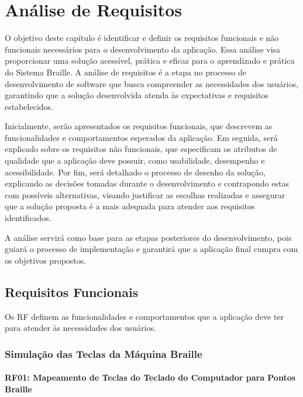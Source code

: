\chapter{Análise de Requisitos} 
\label{chap:Chapter05}

O objetivo deste capítulo é identificar e definir os requisitos funcionais e não funcionais necessários para o desenvolvimento da aplicação. Essa análise visa proporcionar uma solução acessível, prática e eficaz para o aprendizado e prática do Sistema Braille. A análise de requisitos é a etapa no processo de desenvolvimento de software que busca compreender as necessidades dos usuários, garantindo que a solução desenvolvida atenda às expectativas e requisitos estabelecidos.

Inicialmente, serão apresentados os requisitos funcionais, que descrevem as funcionalidades e comportamentos esperados da aplicação. Em seguida, será explicado sobre os requisitos não funcionais, que especificam os atributos de qualidade que a aplicação deve possuir, como usabilidade, desempenho e acessibilidade. Por fim, será detalhado o processo de desenho da solução, explicando as decisões tomadas durante o desenvolvimento e contrapondo estas com possíveis alternativas, visando justificar as escolhas realizadas e assegurar que a solução proposta é a mais adequada para atender aos requisitos identificados. 

A análise servirá como base para as etapas posteriores do desenvolvimento, pois guiará o processo de implementação e garantirá que a aplicação final cumpra com os objetivos propostos.

\section{Requisitos Funcionais}

Os \gls{RF} definem as funcionalidades e comportamentos  que a aplicação deve ter para atender às necessidades dos usuários.

\subsection{Simulação das Teclas da Máquina Braille}

\subsubsection{\gls{RF}01: Mapeamento de Teclas do Teclado do Computador para Pontos Braille}

